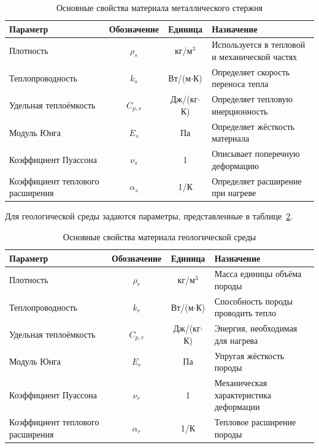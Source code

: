 \begin{table}[h!]
\centering
\caption{Основные свойства материала металлического стержня}
\label{tab:rod_material_properties}
\begin{tabular}{|l|c|c|p{6cm}|}
\hline
\textbf{Параметр} & \textbf{Обозначение} & \textbf{Единица} & \textbf{Назначение} \\
\hline
Плотность & $\rho_s$ & кг/м$^3$ & Используется в тепловой и механической частях \\
\hline
Теплопроводность & $k_s$ & Вт/(м$\cdot$К) & Определяет скорость переноса тепла \\
\hline
Удельная теплоёмкость & $C_{p,s}$ & Дж/(кг$\cdot$К) & Определяет тепловую инерционность \\
\hline
Модуль Юнга & $E_s$ & Па & Определяет жёсткость материала \\
\hline
Коэффициент Пуассона & $\nu_s$ & 1 & Описывает поперечную деформацию \\
\hline
Коэффициент теплового расширения & $\alpha_s$ & 1/К & Определяет расширение при нагреве \\
\hline
\end{tabular}
\end{table}

Для геологической среды задаются параметры, представленные в таблице~\ref{tab:rock_material_properties}.

\begin{table}[h!]
\centering
\caption{Основные свойства материала геологической среды}
\label{tab:rock_material_properties}
\begin{tabular}{|l|c|c|p{6cm}|}
\hline
\textbf{Параметр} & \textbf{Обозначение} & \textbf{Единица} & \textbf{Назначение} \\
\hline
Плотность & $\rho_r$ & кг/м$^3$ & Масса единицы объёма породы \\
\hline
Теплопроводность & $k_r$ & Вт/(м$\cdot$К) & Способность породы проводить тепло \\
\hline
Удельная теплоёмкость & $C_{p,r}$ & Дж/(кг$\cdot$К) & Энергия, необходимая для нагрева \\
\hline
Модуль Юнга & $E_r$ & Па & Упругая жёсткость породы \\
\hline
Коэффициент Пуассона & $\nu_r$ & 1 & Механическая характеристика деформации \\
\hline
Коэффициент теплового расширения & $\alpha_r$ & 1/К & Тепловое расширение породы \\
\hline
\end{tabular}
\end{table}

